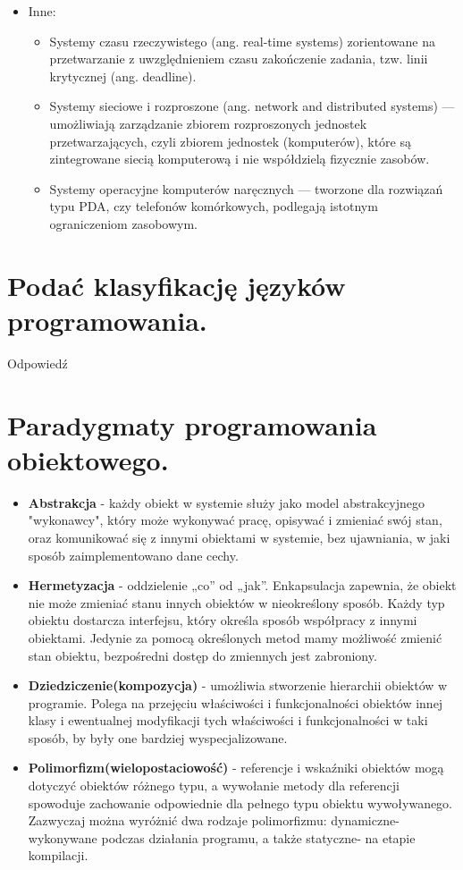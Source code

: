 \documentclass[12pt,a4paper]{article}
\begin{document}
\begin{itemize}
		\item Inne:
		\begin{itemize}
			\item Systemy czasu rzeczywistego (ang. real-time systems) zorientowane na przetwarzanie z uwzględnieniem czasu zakończenie zadania, tzw. linii krytycznej (ang. deadline).
			\item Systemy sieciowe i rozproszone (ang. network and distributed systems) — umożliwiają zarządzanie zbiorem rozproszonych jednostek przetwarzających, czyli zbiorem jednostek (komputerów), które są zintegrowane siecią komputerową i nie współdzielą fizycznie zasobów.
			\item Systemy operacyjne komputerów naręcznych — tworzone dla rozwiązań typu PDA, czy telefonów komórkowych, podlegają istotnym ograniczeniom zasobowym.
		\end{itemize}
	\end{itemize}

	\section{Podać klasyfikację języków programowania.}
	Odpowiedź

	\section{Paradygmaty programowania obiektowego.}
	\begin{itemize}
		\item \textbf{Abstrakcja} - każdy obiekt w systemie służy jako model abstrakcyjnego "wykonawcy", który może wykonywać pracę, opisywać i zmieniać swój stan, oraz komunikować się z innymi obiektami w systemie, bez ujawniania, w jaki sposób zaimplementowano dane cechy.
		
		\item \textbf{Hermetyzacja} - oddzielenie „co” od „jak”. Enkapsulacja zapewnia, że obiekt nie może zmieniać stanu innych obiektów w nieokreślony sposób. Każdy typ obiektu dostarcza interfejsu, który określa sposób współpracy z innymi obiektami. Jedynie za pomocą określonych metod mamy możliwość zmienić stan obiektu, bezpośredni dostęp do zmiennych jest zabroniony.
		
		\item \textbf{Dziedziczenie(kompozycja)} - umożliwia stworzenie hierarchii obiektów w programie. Polega na przejęciu właściwości i funkcjonalności obiektów innej klasy i ewentualnej modyfikacji tych właściwości i funkcjonalności w taki sposób, by były one bardziej wyspecjalizowane.
		
		\item \textbf{Polimorfizm(wielopostaciowość)} - referencje i wskaźniki obiektów mogą dotyczyć obiektów różnego typu, a wywołanie metody dla referencji spowoduje zachowanie odpowiednie dla pełnego typu obiektu wywoływanego. Zazwyczaj można wyróżnić dwa rodzaje polimorfizmu: dynamiczne- wykonywane podczas działania programu, a także statyczne- na etapie kompilacji.
	\end{itemize}
\end{document}
